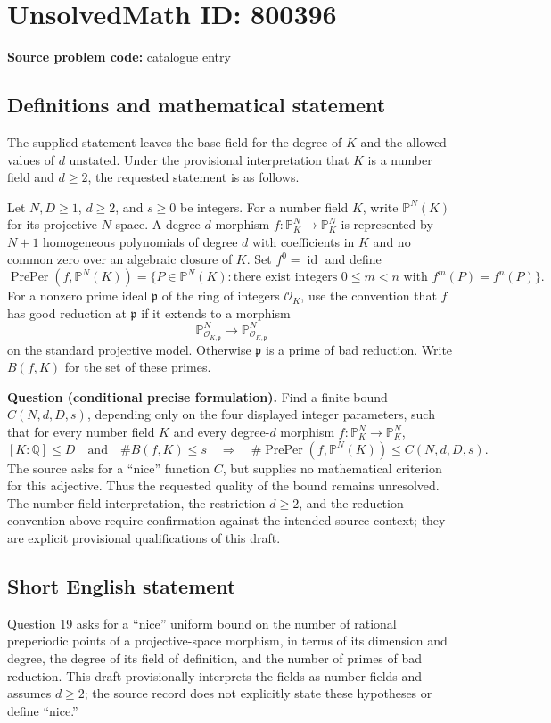 \documentclass[11pt]{article}
\newcommand{\Q}{\mathbb{Q}}
\newcommand{\PP}{\mathbb{P}}
\begin{document}
\section*{UnsolvedMath ID: 800396}
\textbf{Source problem code:} catalogue entry
\subsection{Definitions and mathematical statement}
The supplied statement leaves the base field for the degree of $K$ and the allowed values of $d$ unstated. Under the provisional interpretation that $K$ is a number field and $d\ge 2$, the requested statement is as follows.

Let $N,D\ge 1$, $d\ge 2$, and $s\ge 0$ be integers. For a number field $K$, write $\PP^N(K)$ for its projective $N$-space. A degree-$d$ morphism $f:\PP^N_K\to\PP^N_K$ is represented by $N+1$ homogeneous polynomials of degree $d$ with coefficients in $K$ and no common zero over an algebraic closure of $K$. Set $f^0=\operatorname{id}$ and define
\[
\operatorname{PrePer}(f,\PP^N(K))
=\{P\in\PP^N(K):\text{there exist integers }0\le m<n\text{ with }f^m(P)=f^n(P)\}.
\]
For a nonzero prime ideal $\mathfrak p$ of the ring of integers $\mathcal O_K$, use the convention that $f$ has good reduction at $\mathfrak p$ if it extends to a morphism
\[
\PP^N_{\mathcal O_{K,\mathfrak p}}\longrightarrow\PP^N_{\mathcal O_{K,\mathfrak p}}
\]
on the standard projective model. Otherwise $\mathfrak p$ is a prime of bad reduction. Write $B(f,K)$ for the set of these primes.

\textbf{Question (conditional precise formulation).} Find a finite bound $C(N,d,D,s)$, depending only on the four displayed integer parameters, such that for every number field $K$ and every degree-$d$ morphism $f:\PP^N_K\to\PP^N_K$,
\[
[K:\Q]\le D\quad\text{and}\quad\#B(f,K)\le s
\quad\Longrightarrow\quad
\#\operatorname{PrePer}(f,\PP^N(K))\le C(N,d,D,s).
\]
The source asks for a ``nice'' function $C$, but supplies no mathematical criterion for this adjective. Thus the requested quality of the bound remains unresolved. The number-field interpretation, the restriction $d\ge 2$, and the reduction convention above require confirmation against the intended source context; they are explicit provisional qualifications of this draft.
\subsection{Short English statement}
Question 19 asks for a ``nice'' uniform bound on the number of rational preperiodic points of a projective-space morphism, in terms of its dimension and degree, the degree of its field of definition, and the number of primes of bad reduction. This draft provisionally interprets the fields as number fields and assumes $d\ge 2$; the source record does not explicitly state these hypotheses or define ``nice.''
\end{document}
